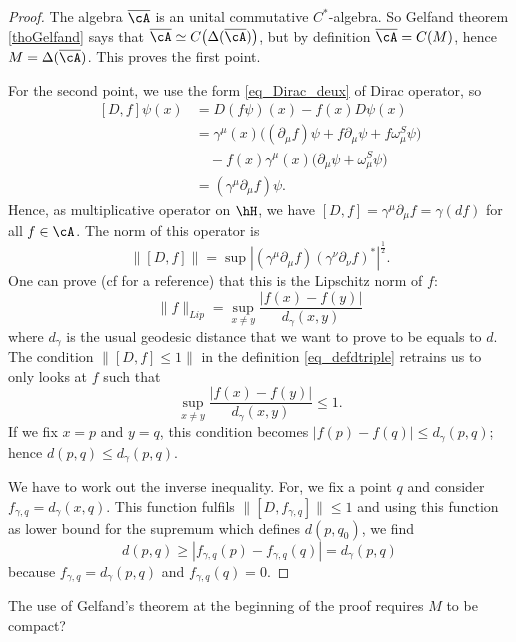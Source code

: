 \begin{proof}
The algebra $\overline{ \cA }$ is an unital commutative $C^*$-algebra. So Gelfand theorem \ref{thoGelfand} says that $\overline{ \cA }\simeq C\big( \Delta(\overline{ \cA }) \big)$, but by definition $\overline{\cA}=C(M)$, hence $M=\Delta(\overline{ \cA })$. This proves the first point.

For the second point, we use the form \eqref{eq_Dirac_deux} of Dirac operator, so
 \begin{equation}
\begin{split}
[D,f]\psi(x)&=D(f\psi)(x)-f(x)D\psi(x)\\
	&=\gamma^{\mu}(x)\big( (\partial_{\mu}f)\psi+f\partial_{\mu}\psi+f\omega_{\mu}^S\psi \big)\\
	&\quad -f(x)\gamma^{\mu}(x)\big( \partial_{\mu}\psi+\omega_{\mu}^S\psi \big)\\
	&=(\gamma^{\mu}\partial_{\mu}f)\psi.
\end{split}
\end{equation}
Hence, as multiplicative operator on $\hH$, we have $[D,f]=\gamma^{\mu}\partial_{\mu}f=\gamma(df)$ for all $f\in\cA$. The norm of this operator is
\[ 
  \| [D,f] \|=\sup | (\gamma^{\mu}\partial_{\mu}f)(\gamma^{\nu}\partial_{\nu}f)^* |^{\frac{ 1 }{2}}.
\]
One can prove (cf \cite{Landi} for a reference) that this is the Lipschitz norm of $f$:
\[ 
  \| f \|_{Lip}=\sup_{x\neq y}\frac{ | f(x)-f(y) | }{ d_{\gamma}(x,y) }
\]
where $d_{\gamma}$ is the usual geodesic distance that we want to prove to be equals to $d$. The condition $\| [D,f]\leq 1 \|$ in the definition  \eqref{eq_defdtriple} retrains us to only looks at $f$ such that 
\[ 
  \sup_{x\neq y}\frac{ | f(x)-f(y) | }{ d_{\gamma}(x,y) }\leq 1.
\]
If we fix $x=p$ and $y=q$, this condition becomes $| f(p)-f(q) |\leq d_{\gamma}(p,q)$; hence $d(p,q)\leq d_{\gamma}(p,q)$. 

We have to work out the inverse inequality. For, we fix a point $q$ and consider $f_{\gamma,q}=d_{\gamma}(x,q)$. This function fulfils $\| [D,f_{\gamma,q}] \| \leq 1$ and using this function as lower bound for the supremum which defines $d(p,q_0)$, we find
\[ 
  d(p,q)\geq | f_{\gamma,q}(p)-f_{\gamma,q}(q) |=d_{\gamma}(p,q)
\]
because $f_{\gamma,q}=d_{\gamma}(p,q)$ and $f_{\gamma,q}(q)=0$.

\end{proof}

\begin{probleme}
	The use of Gelfand's theorem at the beginning of the proof requires $M$ to be compact?
\end{probleme}

